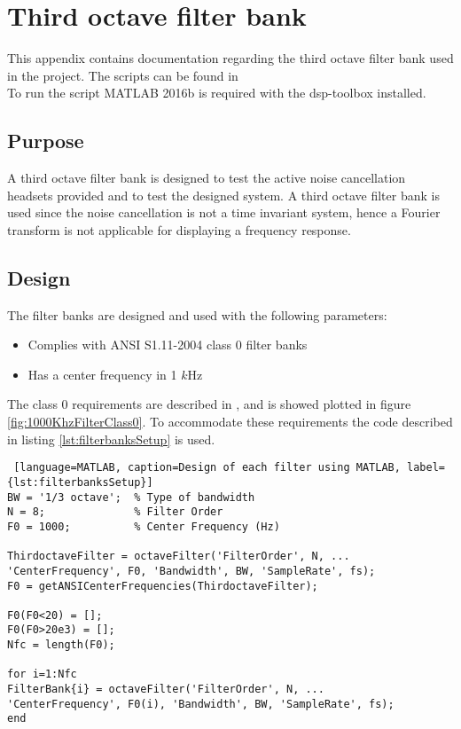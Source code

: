 \section{Third octave filter bank} {\label{sec:OctaveBank}}


This appendix contains documentation regarding the third octave filter bank used in the project. The scripts can be found in 
\\
To run the script MATLAB 2016b is required with the dsp-toolbox installed. 

\subsection{Purpose}

A third octave filter bank is designed to test the active noise cancellation headsets provided and to test the designed system. A third octave filter bank is used since the noise cancellation is not a time invariant system, hence a Fourier transform is not applicable for displaying a frequency response.

\subsection{Design}

The filter banks are designed and used with the following parameters:
\begin{itemize}
	\item Complies with ANSI S1.11-2004 class 0 filter banks
	\item Has a center frequency in 1 $k$Hz
\end{itemize}
The class 0 requirements are described in \cite{OctaveBand}, and is showed plotted in figure \ref{fig:1000KhzFilterClass0}. To accommodate these requirements the code described in listing \ref{lst:filterbanksSetup} is used.

\begin{lstlisting} [language=MATLAB, caption=Design of each filter using MATLAB, label={lst:filterbanksSetup}]
BW = '1/3 octave';	% Type of bandwidth
N = 8;           	% Filter Order
F0 = 1000;       	% Center Frequency (Hz)

ThirdoctaveFilter = octaveFilter('FilterOrder', N, ...
'CenterFrequency', F0, 'Bandwidth', BW, 'SampleRate', fs);
F0 = getANSICenterFrequencies(ThirdoctaveFilter);

F0(F0<20) = [];
F0(F0>20e3) = [];
Nfc = length(F0);

for i=1:Nfc
FilterBank{i} = octaveFilter('FilterOrder', N, ...
'CenterFrequency', F0(i), 'Bandwidth', BW, 'SampleRate', fs); 
end
\end{lstlisting}


